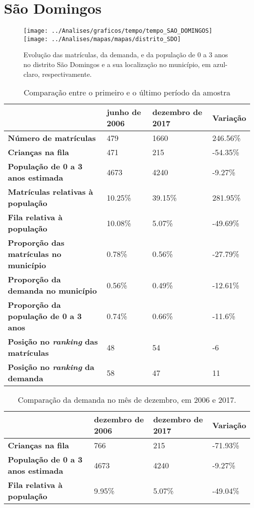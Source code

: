 \section{São Domingos}
\begin{figure}[H]
\centering
\texttt{[image: ../Analises/graficos/tempo/tempo\_SAO\_DOMINGOS]}
\texttt{[image: ../Analises/mapas/mapas/distrito\_SDO]}
\caption{Evolução das matrículas, da demanda, e da população de 0 a 3 anos no distrito São Domingos e a sua localização no município, em azul-claro, respectivamente.}
\end{figure}
\begin{table}[H]
\begin{tabular}{l|l|l|l}
\textbf{}                                      & \textbf{junho de 2006}       & \textbf{dezembro de 2017}    & \textbf{Variação} \\ \hline
\textbf{Número de matrículas}                  & 479 & 1660 & 246.56\% \\ \hline
\textbf{Crianças na fila}                      & 471 & 215 & -54.35\% \\ \hline
\textbf{População de 0 a 3 anos estimada}      & 4673 & 4240 & -9.27\% \\ \hline
\textbf{Matrículas relativas à população}      & 10.25\% & 39.15\% & 281.95\% \\ \hline
\textbf{Fila relativa à população}             & 10.08\% & 5.07\% & -49.69\% \\ \hline
\textbf{Proporção das matrículas no município} & 0.78\% & 0.56\% & -27.79\% \\ \hline
\textbf{Proporção da demanda no município}     & 0.56\% & 0.49\% & -12.61\% \\ \hline
\textbf{Proporção da população de 0 a 3 anos}  & 0.74\% & 0.66\% & -11.6\% \\ \hline
\textbf{Posição no \textit{ranking} das matrículas}     & 48 & 54 & -6 \\ \hline
\textbf{Posição no \textit{ranking} da demanda}         & 58 & 47 & 11 \\ 
\end{tabular}
\caption{Comparação entre o primeiro e o último período da amostra}
\end{table}
\begin{table}[H]
\begin{tabular}{l|l|l|l}
\textbf{}                                 & \textbf{dezembro de 2006} & \textbf{dezembro de 2017} & \textbf{Variação} \\ \hline
\textbf{Crianças na fila}                      & 766 & 215 & -71.93\% \\ \hline
\textbf{População de 0 a 3 anos estimada}      & 4673 & 4240 & -9.27\% \\ \hline
\textbf{Fila relativa à população}             & 9.95\% & 5.07\% & -49.04\% \\
\end{tabular}
\caption{Comparação da demanda no mês de dezembro, em 2006 e 2017.}
\end{table}
